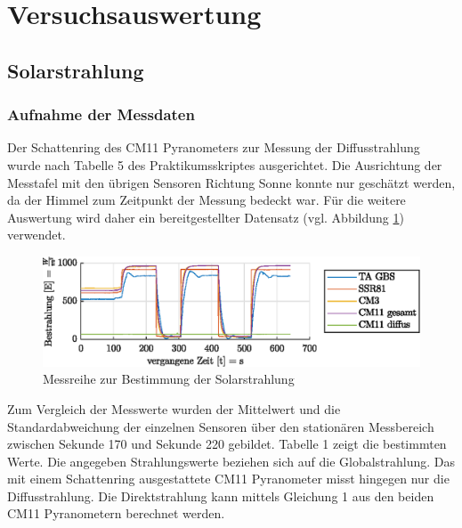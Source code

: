 \section{Versuchsauswertung}

\subsection{Solarstrahlung} 

\subsubsection{Aufnahme der Messdaten}

Der Schattenring des CM11 Pyranometers zur Messung der Diffusstrahlung wurde nach Tabelle 5 des Praktikumsskriptes ausgerichtet. Die Ausrichtung der Messtafel mit den übrigen Sensoren Richtung Sonne konnte nur geschätzt werden, da der Himmel zum Zeitpunkt der Messung bedeckt war. Für die weitere Auswertung wird daher ein bereitgestellter Datensatz (vgl. Abbildung \ref{fig:radiation}) verwendet.

\begin{figure}[H]
	\centering
	\includegraphics[width=\textwidth]{../DATA/Messreihe_Strahlung.eps}
	\caption[Messreihe zur Bestimmung der Solarstrahlung]{Messreihe zur Bestimmung der Solarstrahlung}
	\label{fig:radiation}
\end{figure}
Zum Vergleich der Messwerte wurden der Mittelwert und die Standardabweichung der einzelnen Sensoren über den stationären Messbereich zwischen Sekunde 170 und Sekunde 220 gebildet. Tabelle 1 zeigt die bestimmten Werte. Die angegeben Strahlungswerte beziehen sich auf die Globalstrahlung. Das mit einem Schattenring ausgestattete CM11 Pyranometer misst hingegen nur die Diffusstrahlung. Die Direktstrahlung kann mittels  Gleichung 1 aus den beiden CM11 Pyranometern berechnet werden.

